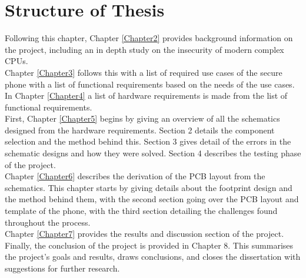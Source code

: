 \section{Structure of Thesis}

Following this chapter, Chapter \ref{Chapter2} provides background information on the project, including an in depth study on the insecurity of modern complex CPUs.\\ Chapter \ref{Chapter3} follows this with a list of required use cases of the secure phone with a list of functional requirements based on the needs of the use cases.\\ 
In Chapter \ref{Chapter4} a list of hardware requirements is made from the list of functional requirements.\\
First, Chapter \ref{Chapter5} begins by giving an overview of all the schematics designed from the hardware requirements. Section 2 details the component selection and the method behind this. Section 3 gives detail of the errors in the schematic designs and how they were solved. Section 4 describes the testing phase of the project.\\
Chapter \ref{Chapter6} describes the derivation of the PCB layout from the schematics. This chapter starts by giving details about the footprint design and the method behind them, with the second section going over the PCB layout and template of the phone, with the third section detailing the challenges found throughout the process.\\
Chapter \ref{Chapter7} provides the results and discussion section of the project.\\
Finally, the conclusion of the project is provided in Chapter 8. This summarises the project's goals and results, draws conclusions, and closes the dissertation with suggestions for further research.
